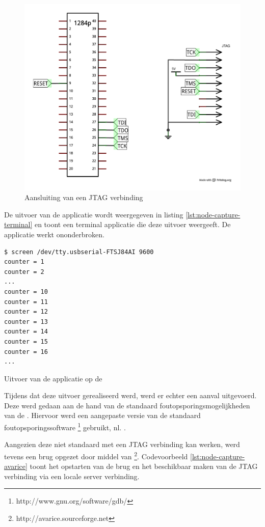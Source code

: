 \begin{figure}[ht]
  \centering
  \includegraphics[width=0.7\linewidth]{resources/node-capture-jtag.pdf}
  \caption{Aansluiting van een JTAG verbinding}
  \label{fig:node-capture-jtag}
\end{figure}

De uitvoer van de applicatie wordt weergegeven in listing
\ref{lst:node-capture-terminal} en toont een terminal applicatie die deze
uitvoer weergeeft. De applicatie werkt ononderbroken.

\begin{listing}[ht]
  \begin{verbatim}
$ screen /dev/tty.usbserial-FTSJ84AI 9600
counter = 1
counter = 2
...
counter = 10
counter = 11
counter = 12
counter = 13
counter = 14
counter = 15
counter = 16
...
\end{verbatim}
  \caption{Uitvoer van de applicatie op de \mcu}
  \label{lst:node-capture-terminal}
\end{listing}

Tijdens dat deze uitvoer gerealiseerd werd, werd er echter een aanval
uitgevoerd. Deze werd gedaan aan de hand van de standaard
foutopsporingsmogelijkheden van de \mcu. Hiervoor werd een aangepaste versie
van de standaard foutopsporingssoftware
\footnote{http://www.gnu.org/software/gdb/} gebruikt, nl.
.

Aangezien deze niet standaard met een JTAG verbinding kan werken, werd tevens
een brug opgezet door middel van
\footnote{http://avarice.sourceforge.net}. Codevoorbeeld
\ref{lst:node-capture-avarice} toont het opstarten van de brug en het
beschikbaar maken van de JTAG verbinding via een locale server verbinding.

